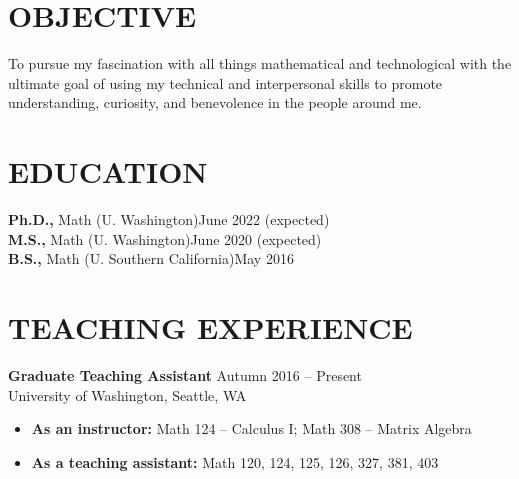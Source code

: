 \documentclass[margin]{res} %
\begin{document}
\begin{resume}

 
\section{OBJECTIVE}  

To pursue my fascination with all things mathematical and technological with the ultimate goal of using my 
technical and interpersonal skills to promote understanding, curiosity, and benevolence in the people around me.


\section{EDUCATION}

{\bf Ph.D.,} Math (U. Washington)\hfill June 2022 (expected) \\
{\bf M.S.,} Math (U. Washington)\hfill June 2020 (expected) \\
{\bf B.S.,} Math (U. Southern California)\hfill May 2016 


 
\section{TEACHING EXPERIENCE}

{\bf Graduate Teaching Assistant} \hfill Autumn 2016 -- Present \\
University of Washington, Seattle, WA

\begin{itemize} \itemsep -1pt %
\item\textbf{As an instructor:} Math 124 -- Calculus I; Math 308 -- Matrix Algebra
\item \textbf{As a teaching assistant:} Math 120, 124, 125, 126, 327, 381, 403
\end{itemize}
 

\end{resume}
\end{document}
